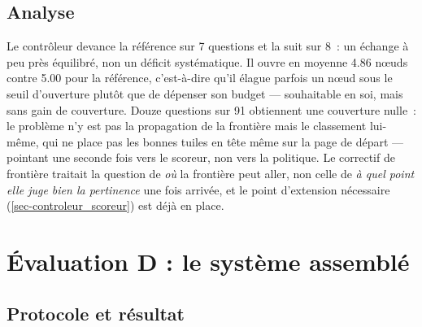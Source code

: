 \subsection{Analyse}
\label{sec-res_c_analyse}

Le contrôleur devance la référence sur \num{7} questions et la suit sur
\num{8}~: un échange à peu près équilibré, non un déficit systématique. Il
ouvre en moyenne \num{4.86} nœuds contre \num{5.00} pour la référence, c'est-à-dire
qu'il élague parfois un nœud sous le seuil d'ouverture plutôt que de dépenser
son budget --- souhaitable en soi, mais sans gain de couverture. Douze
questions sur \num{91} obtiennent une couverture nulle~: le problème n'y est
pas la propagation de la frontière mais le classement lui-même, qui ne place
pas les bonnes tuiles en tête même sur la page de départ --- pointant une
seconde fois vers le scoreur, non vers la politique. Le correctif de
frontière traitait la question de \emph{où} la frontière peut aller, non
celle de \emph{à quel point elle juge bien la pertinence} une fois arrivée,
et le point d'extension nécessaire (\cref{sec-controleur_scoreur}) est déjà en
place.

\section{Évaluation D : le système assemblé}
\label{sec-res_ablation_d}

\subsection{Protocole et résultat}

